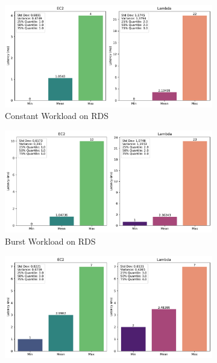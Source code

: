 \begin{figure}[h]
	\begin{subfigure}{0.49\linewidth}
		\centering
		\includegraphics[width=\linewidth]{./fig/bar-rds-constant.pdf}
		\caption{Constant Workload on RDS}
		\label{fig:bar_rds_const}
	\end{subfigure}
	\hfill
	\begin{subfigure}{0.49\linewidth}
		\centering
		\includegraphics[width=\linewidth]{./fig/bar-rds-bursty.pdf}
		\caption{Burst Workload on RDS}
		\label{fig:bar_rds_bursty}
	\end{subfigure}
	\vfill
	\begin{subfigure}{0.49\linewidth}
		\centering
		\includegraphics[width=\linewidth]{./fig/bar-dynamo-constant.pdf}

\end{subfigure}
\end{figure}
